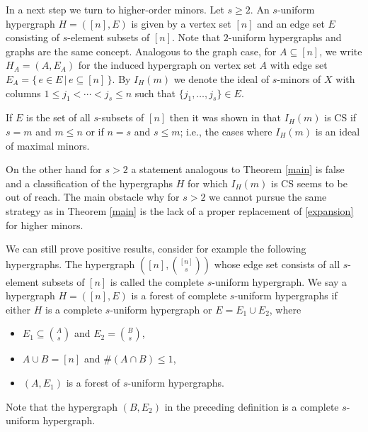 \documentclass{amsart}
\theoremstyle{definition}
\numberwithin{equation}{section}
\begin{document}
In a next step we turn to higher-order minors. 
Let $s \geq 2$. An $s$-uniform hypergraph $H = ([n],E)$ is given by a vertex set $[n]$
and an edge set $E$ consisting of $s$-element subsets of $[n]$.
Note that $2$-uniform hypergraphs and graphs are the same concept.
Analogous to the graph case, for $A \subseteq [n]$, we write $H_A=(A,E_A)$ for the induced hypergraph on vertex set $A$
with edge set $E_A = \{\,e\in E\,|\, e \subseteq [n]\,\}$.
By $I_H(m)$ we denote the ideal of $s$-minors of $X$ with
columns $1 \leq j_1 < \cdots < j_s \leq n$ such that
$\{j_1,\ldots, j_s\} \in E$. 

If $E$ is the set of all $s$-subsets of $[n]$ then it was shown
in \cite[Theorem 2.2, Theorem 3.1]{CDG3} that $I_H(m)$ is CS if $s = m$ and $m \leq n$ or if $n=s$ and $s \leq m$; i.e., the cases where $I_H(m)$  is an ideal of maximal minors.

On the other hand for $s > 2$ a statement analogous to Theorem \ref{main} is false and a classification
of the hypergraphs $H$ for which $I_H(m)$ is CS seems to be out of reach. The main obstacle why for $s > 2$ we cannot pursue the
same strategy as in Theorem \ref{main} is the lack of a proper
replacement of \eqref{expansion} for higher minors.

We can still prove positive results, consider for example the following 
hypergraphs. The hypergraph $([n],\binom{[n]}{s})$ whose edge set
consists of all $s$-element subsets of $[n]$ is called the 
complete $s$-uniform hypergraph. 
We say a hypergraph $H = ([n],E)$ is a forest of complete $s$-uniform 
hypergraphs if either $H$ is a complete 
$s$-uniform hypergraph or $E = E_1 \cup E_2$, where

\begin{itemize}
    \item[(F1)] $E_1 \subseteq \binom{A}{s}$ and $E_2 = \binom{B}{s}$,
    \item[(F2)] $A \cup B = [n]$ and $\# (A \cap B) \leq 1$,
    \item[(F3)]  $(A,E_1)$ is a forest of $s$-uniform hypergraphs.
\end{itemize}

Note that the hypergraph $(B,E_2)$ in the preceding definition is a complete $s$-uniform hypergraph.
\end{document}
